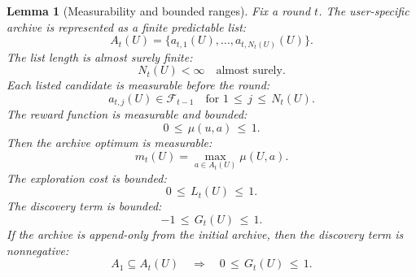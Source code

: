 \documentclass{article} %
\newtheorem{lemma}[theorem]{Lemma}
\begin{document}
\begin{lemma}[Measurability and bounded ranges]
\label{lem:measurable-bounded-ranges}
Fix a round \(t\).  The user-specific archive is represented as a finite predictable list:
\begin{equation}
\label{eq:app-fifth-archive-list}
A_t(U)
=
\{a_{t,1}(U),\ldots,a_{t,N_t(U)}(U)\}.
\end{equation}
The list length is almost surely finite:
\begin{equation}
\label{eq:app-fifth-finite-length}
N_t(U)<\infty
\quad
\text{almost surely}.
\end{equation}
Each listed candidate is measurable before the round:
\begin{equation}
\label{eq:app-fifth-predictable-candidate}
a_{t,j}(U)
\in
\mathcal{F}_{t-1}
\quad
\text{for }1\,\le\, j\,\le\, N_t(U).
\end{equation}
The reward function is measurable and bounded:
\begin{equation}
\label{eq:app-fifth-mu-bounded}
0\,\le\, \mu(u,a)\,\le\, 1.
\end{equation}
Then the archive optimum is measurable:
\begin{equation}
\label{eq:app-fifth-mt-measurable}
m_t(U)
=
\max_{a\in A_t(U)}\mu(U,a).
\end{equation}
The exploration cost is bounded:
\begin{equation}
\label{eq:app-fifth-lt-range}
0\,\le\, L_t(U)\,\le\, 1.
\end{equation}
The discovery term is bounded:
\begin{equation}
\label{eq:app-fifth-gt-range}
-1\,\le\, G_t(U)\,\le\, 1.
\end{equation}
If the archive is append-only from the initial archive, then the discovery term is nonnegative:
\begin{equation}
\label{eq:app-fifth-append-nonnegative}
A_1\subseteq A_t(U)
\quad
\Longrightarrow
\quad
0\,\le\, G_t(U)\,\le\, 1.
\end{equation}
\end{lemma}
\end{document}
